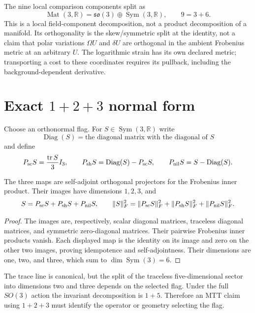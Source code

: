 \documentclass[11pt]{article}
\begin{document}
The nine local comparison components split as
\[
 \operatorname{Mat}(3,\mathbb R)
 =\mathfrak{so}(3)\oplus\operatorname{Sym}(3,\mathbb R),
 \qquad 9=3+6.
\]
This is a local field-component decomposition, not a product decomposition of
a manifold.
Its orthogonality is the skew/symmetric split at the identity, not a claim
that polar variations $\Omega U$ and $\delta U$ are orthogonal in the ambient
Frobenius metric at an arbitrary $U$. The logarithmic strain has its own
declared metric; transporting a cost to these coordinates requires its
pullback, including the background-dependent derivative.

\section{Exact \texorpdfstring{$1+2+3$}{1+2+3} normal form}

Choose an orthonormal flag.  For $S\in\operatorname{Sym}(3,\mathbb R)$ write
\[
 \operatorname{Diag}(S)=\text{the diagonal matrix with the diagonal of }S
\]
and define
\[
 P_{\rm sc}S=\frac{\operatorname{tr}S}{3}I_3,
 \qquad
 P_{\rm sh}S=\operatorname{Diag}(S)-P_{\rm sc}S,
 \qquad
 P_{\rm nil}S=S-\operatorname{Diag}(S).
\]

\begin{theorem}
The three maps are self-adjoint orthogonal projectors for the Frobenius inner
product.  Their images have dimensions $1,2,3$, and
\[
 S=P_{\rm sc}S+P_{\rm sh}S+P_{\rm nil}S,
 \qquad
 \|S\|_F^2
 =\|P_{\rm sc}S\|_F^2
 +\|P_{\rm sh}S\|_F^2
 +\|P_{\rm nil}S\|_F^2.
\]
\end{theorem}

\begin{proof}
The images are, respectively, scalar diagonal matrices, traceless diagonal
matrices, and symmetric zero-diagonal matrices.  Their pairwise Frobenius
inner products vanish.  Each displayed map is the identity on its image and
zero on the other two images, proving idempotence and self-adjointness.  Their
dimensions are one, two, and three, which sum to
$\dim\operatorname{Sym}(3)=6$.
\end{proof}

\begin{remark}
The trace line is canonical, but the split of the traceless five-dimensional
sector into dimensions two and three depends on the selected flag.  Under the
full $SO(3)$ action the invariant decomposition is $1+5$.  Therefore an MTT
claim using $1+2+3$ must identify the operator or geometry selecting the flag.
\end{remark}
\end{document}
